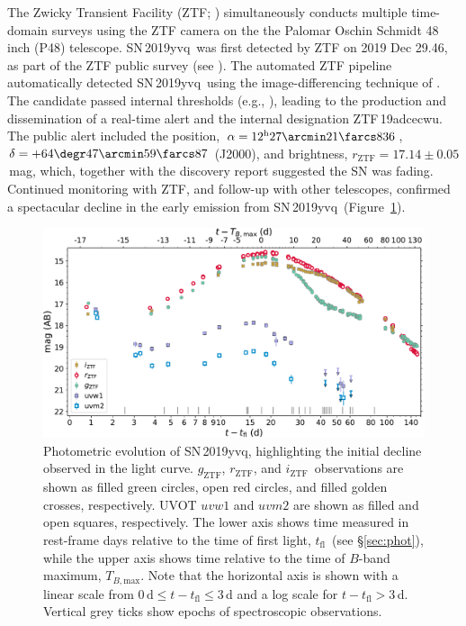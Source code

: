 \documentclass[twocolumn]{aastex63}
\newcommand{\rztf}{$r_\mathrm{ZTF}$}
\newcommand{\gztf}{$g_\mathrm{ZTF}$}
\newcommand{\iztf}{$i_\mathrm{ZTF}$}
\newcommand{\tfl}{$t_\mathrm{fl}$}
\newcommand{\tbmax}{$T_{B,\mathrm{max}}$}
\newcommand{\sn}{SN\,2019yvq}
\begin{document}
The Zwicky Transient Facility (ZTF; \citealt{Bellm19,Graham19,Dekany20})
simultaneously conducts multiple time-domain surveys using the ZTF camera on
the the Palomar Oschin Schmidt 48 inch (P48) telescope. \sn\ was first
detected by ZTF on 2019 Dec 29.46, as part of the ZTF public survey (see
\citealt{Bellm19a}). The automated ZTF pipeline \citep{Masci19} automatically
detected \sn\ using the image-differencing technique of \citet{Zackay16}. The
candidate passed internal thresholds (e.g., \citealt{Mahabal19}), leading to
the production and dissemination of a real-time alert \citep{Patterson19} and
the internal designation ZTF\,19adcecwu. The public alert included the
position, $\alpha = 12^{\mathrm{h}}27\arcmin21\farcs836$, $\delta =
+64\degr47\arcmin59\farcs87$ (J2000), and brightness, \rztf$ =
17.14\pm0.05$\,mag, which, together with the \citet{Itagaki19} discovery
report suggested the SN was fading. Continued monitoring with ZTF, and
follow-up with other telescopes, confirmed a spectacular decline in the early
emission from \sn\ (Figure~\ref{fig:p48}).

\begin{figure}
    \centering
    \includegraphics[width=6in]{./figures/P48_lc.pdf}
    \caption{Photometric evolution of \sn, highlighting the initial decline
    observed in the light curve. \gztf, \rztf, and \iztf\ observations are
    shown as filled green circles, open red circles, and filled golden
    crosses, respectively. UVOT $uvw1$ and $uvm2$ are shown as filled and
    open squares, respectively. The lower axis shows time measured in
    rest-frame days relative to the time of first light, \tfl\ (see
    \S\ref{sec:phot}), while the upper axis shows time relative to the time
    of $B$-band maximum, \tbmax. Note that the horizontal axis is shown with
    a linear scale from $0\,\mathrm{d} \le t - t_\mathrm{fl} \le 3$\,d and a
    log scale for $t - t_\mathrm{fl} > 3$\,d. Vertical grey ticks show
    epochs of spectroscopic observations.}
    \label{fig:p48}
\end{figure}
\end{document}
